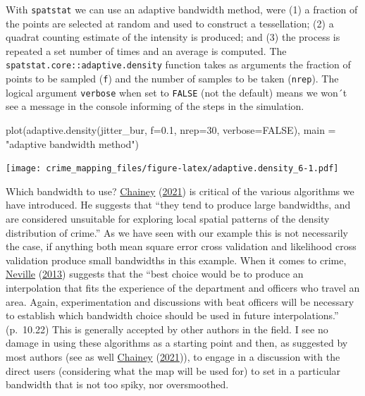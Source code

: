 \documentclass[
  krantz2]{krantz}
\makeatletter
\newenvironment{Shaded}{\begin{snugshade}}{\end{snugshade}}
\newcommand{\AttributeTok}[1]{\textcolor[rgb]{0.61,0.61,0.61}{#1}}
\newcommand{\ConstantTok}[1]{\textcolor[rgb]{0,0,0}{#1}}
\newcommand{\DecValTok}[1]{\textcolor[rgb]{0.06,0.06,0.06}{#1}}
\newcommand{\FloatTok}[1]{\textcolor[rgb]{0.06,0.06,0.06}{#1}}
\newcommand{\FunctionTok}[1]{\textcolor[rgb]{0,0,0}{#1}}
\newcommand{\NormalTok}[1]{#1}
\newcommand{\StringTok}[1]{\textcolor[rgb]{0.5,0.5,0.5}{#1}}
\newenvironment{kframe}{%
\medskip{}
\setlength{\fboxsep}{.8em}
 \def\at@end@of@kframe{}%
 \ifinner\ifhmode%
  \def\at@end@of@kframe{\end{minipage}}%
  \begin{minipage}{\columnwidth}%
 \fi\fi%
 \def\FrameCommand##1{\hskip\@totalleftmargin \hskip-\fboxsep
 \colorbox{shadecolor}{##1}\hskip-\fboxsep
     \hskip-\linewidth \hskip-\@totalleftmargin \hskip\columnwidth}%
 \MakeFramed {\advance\hsize-\width
   \@totalleftmargin\z@ \linewidth\hsize
   \@setminipage}}%
 {\par\unskip\endMakeFramed%
 \at@end@of@kframe}
\renewenvironment{Shaded}{\begin{kframe}}{\end{kframe}}
\makeatother
\begin{document}
With \texttt{spatstat} we can use an adaptive bandwidth method, were (1) a fraction of the points are selected at random and used to construct a tessellation; (2) a quadrat counting estimate of the intensity is produced; and (3) the process is repeated a set number of times and an average is computed. The \texttt{spatstat.core::adaptive.density} function takes as arguments the fraction of points to be sampled (\texttt{f}) and the number of samples to be taken (\texttt{nrep}). The logical argument \texttt{verbose} when set to \texttt{FALSE} (not the default) means we won´t see a message in the console informing of the steps in the simulation.

\begin{Shaded}
\begin{Highlighting}[]
\FunctionTok{plot}\NormalTok{(}\FunctionTok{adaptive.density}\NormalTok{(jitter\_bur, }\AttributeTok{f=}\FloatTok{0.1}\NormalTok{, }\AttributeTok{nrep=}\DecValTok{30}\NormalTok{, }\AttributeTok{verbose=}\ConstantTok{FALSE}\NormalTok{), }
     \AttributeTok{main =} \StringTok{"adaptive bandwidth method"}\NormalTok{)}
\end{Highlighting}
\end{Shaded}

\texttt{[image: crime\_mapping\_files/figure-latex/adaptive.density\_6-1.pdf]}

Which bandwidth to use? \protect\hyperlink{ref-Chainey_2021}{Chainey} (\protect\hyperlink{ref-Chainey_2021}{2021}) is critical of the various algorithms we have introduced. He suggests that ``they tend to produce large bandwidths, and are considered unsuitable for exploring local spatial patterns of the density distribution of crime.'' As we have seen with our example this is not necessarily the case, if anything both mean square error cross validation and likelihood cross validation produce small bandwidths in this example. When it comes to crime, \protect\hyperlink{ref-Neville_2013}{Neville} (\protect\hyperlink{ref-Neville_2013}{2013}) suggests that the ``best choice would be to produce an interpolation that fits the experience of the department and officers who travel an area. Again, experimentation and discussions with beat officers will be necessary to establish which bandwidth choice should be used in future interpolations.'' (p.~10.22) This is generally accepted by other authors in the field. I see no damage in using these algorithms as a starting point and then, as suggested by most authors (see as well \protect\hyperlink{ref-Chainey_2021}{Chainey} (\protect\hyperlink{ref-Chainey_2021}{2021})), to engage in a discussion with the direct users (considering what the map will be used for) to set in a particular bandwidth that is not too spiky, nor oversmoothed.
\end{document}
